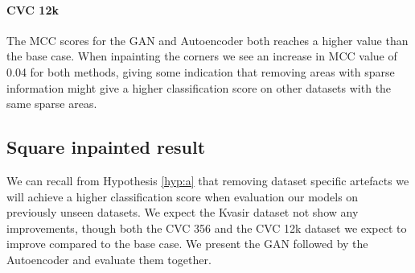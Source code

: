 \paragraph{CVC 12k}
The MCC scores for the GAN and Autoencoder both reaches a higher value than the base case. When inpainting the corners we see an increase in MCC value of 0.04 for both methods, giving some indication that removing areas with sparse information might give a higher classification score on other datasets with the same sparse areas.





































\subsection{Square inpainted result}


We can recall from Hypothesis \ref{hyp:a} that removing dataset specific artefacts we will achieve a higher classification score when evaluation our models on previously unseen datasets.
We expect the Kvasir dataset not show any improvements, though both the CVC 356 and the CVC 12k dataset we expect to improve compared to the base case. 
We present the GAN followed by the Autoencoder and evaluate them together.


